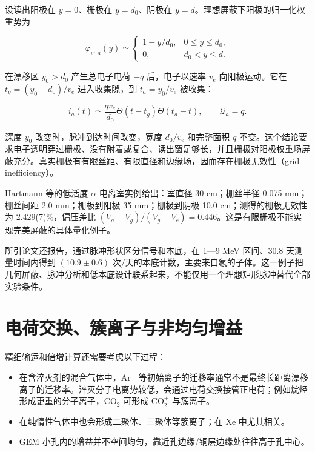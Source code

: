 \documentclass[
  11pt,
  a4paper,
  oneside,
  openany]{report}
\providecommand{\tightlist}{%
  \setlength{\itemsep}{0pt}\setlength{\parskip}{0pt}}
\numberwithin{equation}{chapter}
\begin{document}
设读出阳极在 \(y=0\)、栅极在 \(y=d_0\)、阴极在
\(y=d\)。理想屏蔽下阳极的归一化权重势为

\begin{equation}
\varphi_{w,a}(y)\simeq
\begin{cases}
1-y/d_0,&0\le y\le d_0,\\
0,&d_0<y\le d.
\end{cases}
\end{equation}

在漂移区 \(y_0>d_0\) 产生总电子电荷 \(-q\) 后，电子以速率 \(v_e\)
向阳极运动。它在 \(t_g=(y_0-d_0)/v_e\) 进入收集隙，到 \(t_a=y_0/v_e\)
被收集：

\begin{equation}
i_a(t)\simeq\frac{qv_e}{d_0}
\Theta(t-t_g)\Theta(t_a-t),\qquad
\mathcal Q_a=q.
\end{equation}

深度 \(y_0\) 改变时，脉冲到达时间改变，宽度 \(d_0/v_e\) 和完整面积 \(q\)
不变。这个结论要求电子透明穿过栅极、没有附着或复合、读出窗足够长，并且栅极对阳极权重场屏蔽充分。真实栅极有有限丝距、有限直径和边缘场，因而存在栅极无效性（grid
inefficiency）。

Hartmann 等的低活度 \(\alpha\) 电离室实例给出：室直径 30 cm；栅丝半径
0.075 mm；栅丝间距 2.0 mm；栅极到阳极 35 mm；栅极到阴极 10.0
cm；测得的栅极无效性为 2.429(7)\%，偏压差比
\((V_a-V_g)/(V_g-V_c)=0.446\)。这是有限栅极不能实现完美屏蔽的具体量化例子。

所引论文还报告，通过脉冲形状区分信号和本底，在 1---9 MeV 区间、30.8
天测量时间内得到 \((10.9\pm0.6)\)
次/天的本底计数，主要来自氡的子体。这一例子把几何屏蔽、脉冲分析和低本底设计联系起来，不能仅用一个理想矩形脉冲替代全部实验条件。


\section{电荷交换、簇离子与非均匀增益}\label{ux7535ux8377ux4ea4ux6362ux7c07ux79bbux5b50ux4e0eux975eux5747ux5300ux589eux76ca}

精细输运和倍增计算还需要考虑以下过程：

\begin{itemize}
\tightlist
\item
  在含淬灭剂的混合气体中，Ar\(^+\)
  等初始离子的迁移率通常不是最终长距离漂移离子的迁移率。淬灭分子电离势较低，会通过电荷交换接管正电荷；例如烷烃形成更重的分子离子，CO\(_2\)
  可形成 CO\(_2^+\) 与簇离子。
\item
  在纯惰性气体中也会形成二聚体、三聚体等簇离子；在 Xe 中尤其相关。
\item
  GEM 小孔内的增益并不空间均匀，靠近孔边缘/铜层边缘处往往高于孔中心。
\end{itemize}
\end{document}
